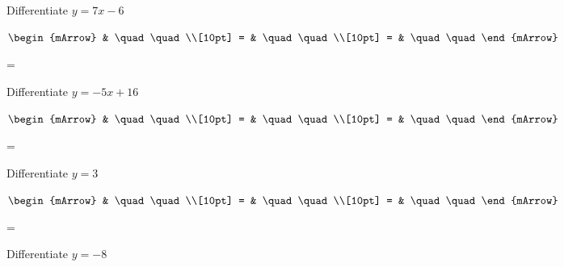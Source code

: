 \clearpage
\begin{mtask}
	\task \begin{exercise} Differentiate $y=7x-6$
           \begin{envSolution}
             $\begin{mArrow}
                   & \quad \quad              \\[10pt]
		   		 = & \quad \quad              \\[10pt]
				 = & \quad \quad 
              \end{mArrow}$
            \begin{shortsolution}  
			     =$ \quad \quad \quad \quad$
			\end{shortsolution}				 
           \end{envSolution}
         \end{exercise}
	\task \begin{exercise} Differentiate $y=-5x+16$
           \begin{envSolution}
             $\begin{mArrow}
                   & \quad \quad              \\[10pt]
		   		 = & \quad \quad              \\[10pt]
				 = & \quad \quad 
              \end{mArrow}$
            \begin{shortsolution}  
			     =$ \quad \quad \quad \quad$
			\end{shortsolution}				 
           \end{envSolution}
         \end{exercise}
	\task \begin{exercise} Differentiate $y=3$
           \begin{envSolution}
             $\begin{mArrow}
                   & \quad \quad              \\[10pt]
		   		 = & \quad \quad              \\[10pt]
				 = & \quad \quad 
              \end{mArrow}$
            \begin{shortsolution}  
			     =$ \quad \quad \quad \quad$
			\end{shortsolution}				 
           \end{envSolution}
         \end{exercise}
	\task \begin{exercise} Differentiate $y=-8$
           \begin{envSolution}

\end{envSolution}
\end{exercise}
\end{mtask}
